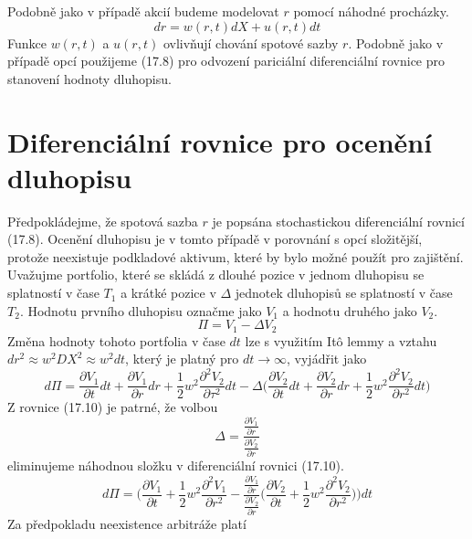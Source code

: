 \documentclass[a4paper]{book}
\begin{document}
Podobně jako v případě akcií budeme modelovat $r$ pomocí náhodné procházky.
\begin{equation}
dr = w(r,t)dX + u(r,t)dt
\end{equation}
Funkce $w(r,t)$ a $u(r,t)$ ovlivňují chování spotové sazby $r$. Podobně jako v případě opcí použijeme (17.8) pro odvození pariciální diferenciální rovnice pro stanovení hodnoty dluhopisu.

\section{Diferenciální rovnice pro ocenění dluhopisu}

Předpokládejme, že spotová sazba $r$ je popsána stochastickou diferenciální rovnicí (17.8). Ocenění dluhopisu je v tomto případě v porovnání s opcí složitější, protože neexistuje podkladové aktivum, které by bylo možné použít pro zajištění. Uvažujme portfolio, které se skládá z dlouhé pozice v jednom dluhopisu se splatností v čase $T_1$ a krátké pozice v $\Delta$ jednotek dluhopisů se splatností v čase $T_2$. Hodnotu prvního dluhopisu označme jako $V_1$ a hodnotu druhého jako $V_2$.
\begin{equation}
\Pi = V_1 - \Delta V_2
\end{equation}
Změna hodnoty tohoto portfolia v čase $dt$ lze s využitím It\^o lemmy a vztahu $dr^2 \approx w^2 DX^2 \approx w^2 dt$, který je platný pro $dt \rightarrow \infty$, vyjádřit jako
\begin{equation}
d \Pi = \frac{\partial V_1}{\partial t}dt + \frac{\partial V_1}{\partial r}dr + \frac{1}{2}w^2\frac{\partial^2 V_2}{\partial \tau^2}dt - \Delta \Bigg( \frac{\partial V_2}{\partial t}dt + \frac{\partial V_2}{\partial r}dr + \frac{1}{2}w^2 \frac{\partial^2 V_2}{\partial r^2} dt \Bigg)
\end{equation}
Z rovnice (17.10) je patrné, že volbou
\begin{equation*}
\Delta = \frac{\frac{\partial V_1}{\partial r}}{\frac{\partial V_2}{\partial r}}
\end{equation*}
eliminujeme náhodnou složku v diferenciální rovnici (17.10).
\begin{equation*}
d \Pi = \Bigg( \frac{\partial V_1}{\partial t} + \frac{1}{2}w^2\frac{\partial^2 V_1}{\partial r^2} - \frac{\frac{\partial V_1}{\partial r}}{\frac{\partial V_2}{\partial r}}\Bigg( \frac{\partial V_2}{\partial t} + \frac{1}{2}w^2\frac{\partial^2 V_2}{\partial r^2}\Bigg) \Bigg)dt
\end{equation*}
Za předpokladu neexistence arbitráže platí
\end{document}

